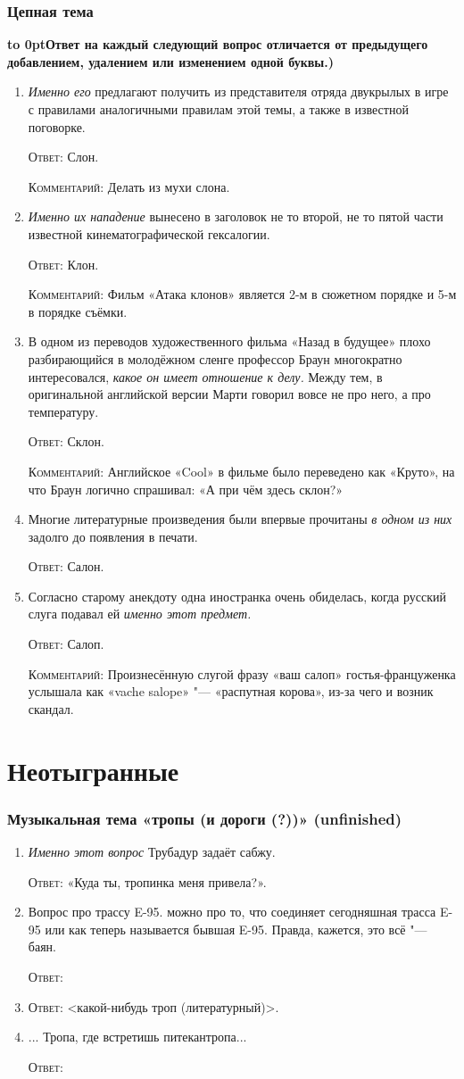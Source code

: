 \documentclass[a4paper,10pt]{article}
\let\keyword\textsc
\newenvironment{topic}{\begin{enumerate}}{\end{enumerate}}
\newcommand{\question}[3]{\item[#1.] #2 \par \keyword{Ответ:} #3}
\newcommand{\commentary}[1]{\par \keyword{Комментарий:} #1}
\newcommand{\topiccommentary}[1]{\begin{adjustwidth}{0.9cm}{} \vspace{-0.3em}\textbf{\hbox to 0pt{\hss{(}}#1)} \end{adjustwidth}}
\begin{document}
\section{Цепная тема}
\topiccommentary{Ответ на каждый следующий вопрос отличается от предыдущего добавлением, удалением или изменением одной буквы.}

\begin{topic}
 \question{10}{\emph{Именно его} предлагают получить из представителя отряда двукрылых в игре с правилами аналогичными правилам этой темы, а также в известной поговорке.}{Слон.}\commentary{Делать из мухи слона.}
 \question{20}{\emph{Именно их нападение} вынесено в заголовок не то второй, не то пятой части известной кинематографической гексалогии.}{Клон.}\commentary{Фильм «Атака клонов» является 2-м в сюжетном порядке и 5-м в порядке съёмки.}
 \question{30}{В одном из переводов художественного фильма «Назад в будущее» плохо разбирающийся в молодёжном сленге профессор Браун многократно интересовался, \emph{какое он имеет отношение к делу.} Между тем, в оригинальной английской версии Марти говорил вовсе не про него, а про температуру.}{Склон.}\commentary{Английское «Cool» в фильме было переведено как «Круто», на что Браун логично спрашивал: «А при чём здесь склон?»}
 \question{40}{Многие литературные произведения были впервые прочитаны \emph{в одном из них} задолго до появления в печати.}{Салон.}
 \question{50}{Согласно старому анекдоту одна иностранка очень обиделась, когда русский слуга подавал ей \emph{именно этот предмет.}}{Салоп.}\commentary{Произнесённую слугой фразу «ваш салоп» гостья-француженка услышала как «vache salope» "--- «распутная корова», из-за чего и возник скандал.}
\end{topic}


\newpage
\part{Неотыгранные}

\section{Музыкальная тема «тропы (и дороги (?))» (unfinished)}

\begin{topic}
 \question{10}{\emph{Именно этот вопрос} Трубадур задаёт сабжу.}{«Куда ты, тропинка меня привела?».}
 \question{20--40}{Вопрос про трассу E-95. можно про то, что соединяет сегодняшная трасса E-95 или как теперь называется бывшая E-95. Правда, кажется, это всё "--- баян.}{}  %
 \question{30--40}{}{<какой-нибудь троп (литературный)>.}
 \question{??}{... Тропа, где встретишь питекантропа...}{}
\end{topic}
\end{document}
